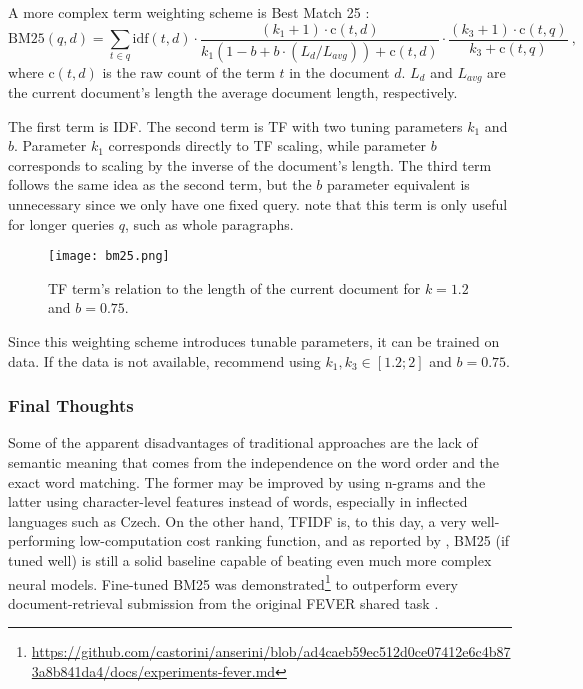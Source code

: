 A more complex term weighting scheme is Best Match 25 \citep{bm25}:
\begin{equation}
\text{BM25}(q, d) = 
        \sum_{t\in q}
        \text{idf}(t, d)
        \cdot \frac{(k_1 + 1)\cdot\text{c}(t, d)}{k_1(1-b + b \cdot (L_d / L_{avg})) + \text{c}(t, d)} 
        \cdot \frac{(k_3 + 1)\cdot\text{c}(t, q)}{k_3 + \text{c}(t, q)}
\ ,
\end{equation}
where $\text{c}(t,d)$ is the raw count of the term $t$ in the document $d$. $L_d$ and $L_{avg}$ are the current document's length the average document length, respectively.

The first term is IDF.
The second term is TF with two tuning parameters $k_1$ and $b$. Parameter $k_1$ corresponds directly to TF scaling, while parameter $b$ corresponds to scaling by the inverse of the document's length.
The third term follows the same idea as the second term, but the $b$ parameter equivalent is unnecessary since we only have one fixed query.
\citet{schutze2008introduction} note that this term is only useful for longer queries $q$, such as whole paragraphs. 
\begin{figure}[h!]
    \centering
    \texttt{[image: bm25.png]}
    \caption[BM25 TF Visualization]{TF term's relation to the length of the current document for $k=1.2$ and $b=0.75$.}
\end{figure}

Since this weighting scheme introduces tunable parameters, it can be trained on data. If the data is not available, \citet[Section 11.4.3]{schutze2008introduction} recommend using $k_1, k_3 \in [1.2;2]$ and $b=0.75$.


\subsubsection{Final Thoughts}

Some of the apparent disadvantages of traditional approaches are the lack of semantic meaning that comes from the independence on the word order and the exact word matching. %
The former may be improved by using n-grams and the latter using character-level features instead of words, especially in inflected languages such as Czech.
On the other hand, TFIDF is, to this day, a very well-performing low-computation cost ranking function, and as reported by \cite{weak-baselines}, BM25 (if tuned well) is still a solid baseline capable of beating even much more complex neural models.
Fine-tuned BM25 was demonstrated\footnote{\url{https://github.com/castorini/anserini/blob/ad4caeb59ec512d0ce07412e6c4b873a8b841da4/docs/experiments-fever.md}} to outperform every document-retrieval submission from the original FEVER shared task \citep{fever-2018-shared-task}.

